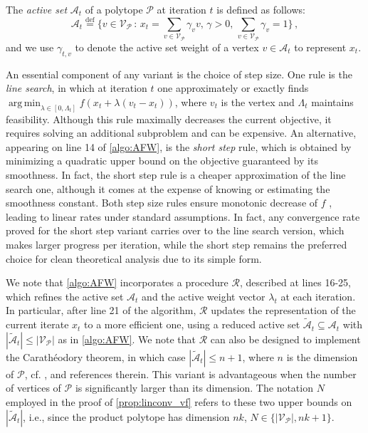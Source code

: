 \documentclass[twoside]{article}
\newcommand{\mP}{\mathcal{P}}
\newcommand{\mA}{\mathcal{A}}
\newcommand{\verts}[1]{\mathcal{V}_{#1}}
\DeclareMathOperator*{\argmin}{\mathrm{arg\,min}}
\newcommand{\defi}{\stackrel{\mathrm{\scriptscriptstyle def}}{=}}
\begin{document}
%
The \emph{active set} $\mA_t$ of a polytope $\mP$ at iteration $t$ is defined as follows: 
\[
\mA_t \defi \{v \in \verts{\mP}\,:\, x_t = \sum_{v \in \verts{\mP}} \gamma_v v,\, \gamma>0,\, \sum_{v \in \verts{\mP}}\gamma_v = 1\}\,,
\] 
and we use $\gamma_{t,v}$ to denote the active set weight of a vertex $v \in \mA_t$ to represent $x_t$.

An essential component of any \FW{} variant is the choice of step size. 
One rule is the \emph{line search}, in which at iteration $t$ one approximately or exactly finds $\argmin_{\lambda \in [0,\Lambda_t]} f(x_t + \lambda(v_t - x_t))$, where $v_t$ is the \LMO{} vertex and $\Lambda_t$ maintains feasibility.
Although this rule maximally decreases the current objective, it requires solving an additional subproblem and can be expensive.
An alternative, appearing on line 14 of \cref{algo:AFW}, is the \emph{short step} rule, which is obtained by minimizing a quadratic upper bound on the objective guaranteed by its smoothness. In fact, the short step rule is a cheaper approximation of the line search one, although it comes at the expense of knowing or estimating the smoothness constant.
Both step size rules ensure monotonic decrease of $f$ \citep{BCC+23}, leading to linear rates under standard assumptions.
In fact, any convergence rate proved for the short step variant carries over to the line search version, which makes larger progress per iteration, while the short step remains the preferred choice for clean theoretical analysis due to its simple form.


We note that \cref{algo:AFW} incorporates a procedure $\mathcal{R}$, described at lines 16-25, which refines the active set $\mA_t$ and the active weight vector $\lambda_t$ at each iteration. In particular, after line 21 of the algorithm, $\mathcal{R}$ updates the representation of the current iterate $x_t$ to a more efficient one, using a reduced active set $\tilde{\mA}_t \subseteq \mA_t$ with $|\tilde{\mA}_t| \leq |\verts{\mP}|$ as in \cref{algo:AFW}. We note that $\mathcal{R}$ can also be designed to implement the Carathéodory theorem, in which case $|\tilde{\mA}_t| \le n+1$, where $n$ is the dimension of $\mP$, cf. \citep[Appendix A]{BS15}, \citep{BPW24} and references therein. This variant is advantageous when the number of vertices of $\mP$ is significantly larger than %
its dimension. The notation $N$ employed in the proof of \cref{prop:linconv_vf} refers to these two upper bounds on $|\tilde{\mA}_t|$, i.e., since the product polytope has dimension $nk$, $N \in \{|\verts{\mP}|, nk+1\}$.
\end{document}
